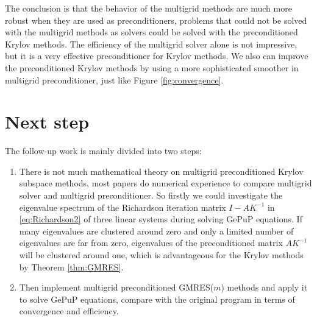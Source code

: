 The conclusion is that the behavior of the multigrid methods
are much more robust when they are used as preconditioners, problems
that could not be solved with the multigrid methods as solvers could
be solved with the preconditioned Krylov methods. The efficiency of
the multigrid solver alone is not impressive, but it is a very
effective preconditioner for Krylov methods. We also can improve the
preconditioned Krylov methods by using a more sophisticated smoother
in multigrid preconditioner, just like Figure \ref{fig:convergence}.

\section{Next step}
\label{sec:goal}

The follow-up work is mainly divided into two steps:

\begin{enumerate}
\item There is not much mathematical theory on multigrid
  preconditioned Krylov subspace methods, most papers do numerical
  experience to compare multigrid solver and multigrid preconditioner.
  So firstly we could investigate the eigenvalue spectrum of the
  Richardson iteration matrix $I-AK^{-1}$ in
  \eqref{eq:Richardson2} of three linear systems during solving GePuP
  equations. If many eigenvalues are clustered around zero and only a
  limited number of eigenvalues are far from zero, eigenvalues of the preconditioned
  matrix $AK^{-1}$  will be clustered around one, which is
  advantageous for the Krylov methods by Theorem \ref{thm:GMRES}.
\item Then implement multigrid preconditioned GMRES($m$) methods and
  apply it to solve GePuP equations, compare with the original program
  in terms of convergence and efficiency.
\end{enumerate}



